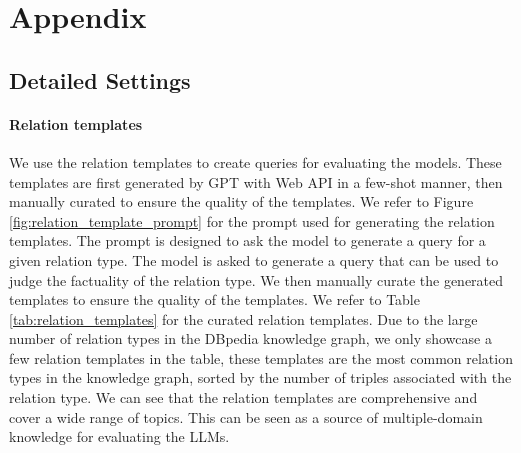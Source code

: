 
\newpage
\section{Appendix}














\subsection{Detailed Settings}
\label{app:detailed_settings} 


   



\paragraph{Relation templates}
We use the relation templates to create queries for evaluating the models.
These templates are first generated by GPT with Web API in a few-shot manner, then manually curated to ensure the quality of the templates. We refer to Figure \ref{fig:relation_template_prompt} for the prompt used
for generating the relation templates. The prompt is designed to ask the model to generate a query for a given relation type. The model is asked to generate a query that can be used to judge the factuality of the relation type. We then manually curate the generated templates to ensure the quality of the templates. 
We refer to Table \ref{tab:relation_templates} for the curated relation templates.  Due to the large number of relation types in the DBpedia knowledge graph, we only showcase a few relation templates in the table, these templates are the most common relation types in the knowledge graph, sorted by the number of triples associated with the relation type.
 We can see that the relation templates are comprehensive and cover a wide range of topics. This can be seen as a source of multiple-domain knowledge for evaluating the LLMs.



